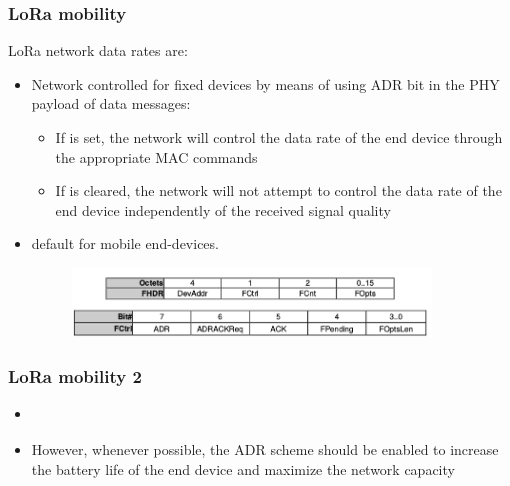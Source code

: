 \begin{frame}[fragile]
  \frametitle{LoRa mobility}
  LoRa network data rates are:
 \begin{itemize}
  \item Network controlled for fixed devices by means of using ADR bit in the PHY payload of data messages:
  \begin{itemize}
    \item If is set, the network will control the data rate of the end device through the appropriate MAC commands
    \item If is cleared, the network will not attempt to control the data rate of the end device independently of the received signal quality
  \end{itemize}
  \item default for mobile end-devices.
\begin{figure}
  \centering
  \includegraphics[width=0.9\textwidth]{img/PHYpayload.png}
  \end{figure}
 \end{itemize}

\end{frame}

\begin{frame}[fragile]
  \frametitle{LoRa mobility 2}
 \begin{itemize}
  \item \hypertarget{refthis}{}
  \item However, whenever possible, the ADR scheme should
be enabled to increase the battery life of the end device and maximize the network capacity
 \end{itemize}

\end{frame}